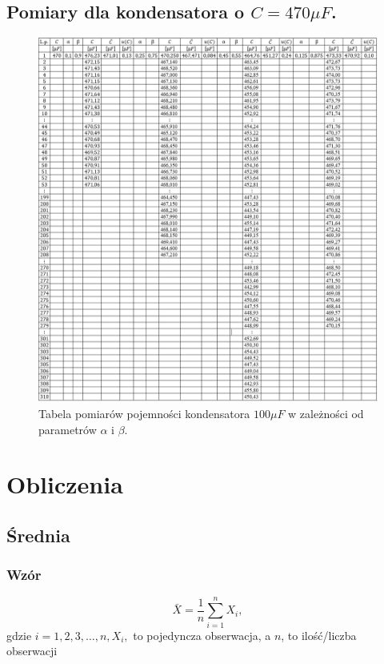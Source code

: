 \documentclass[12pt]{mwart}
\begin{document}
	\subsection{Pomiary dla kondensatora o $C=470\mu F$.}
	\begin{figure}[H]
		\centering
		\includegraphics[width=1\linewidth]{470_tab.jpg}
		\caption{Tabela pomiarów pojemności kondensatora $100\mu F$ w zależności od parametrów $\alpha$ i $\beta$.}
	\end{figure}
	\section{Obliczenia}
	\subsection{Średnia}
	\subsubsection{Wzór}
	\begin{equation}
		\bar X = \frac{1}{n}\sum\limits_{i=1}^{n} X_{i},
	\end{equation}
	gdzie $i=1,2,3,\dots ,n, X_{i},$ to pojedyncza obserwacja, a $n$, to ilość/liczba obserwacji
\end{document}
